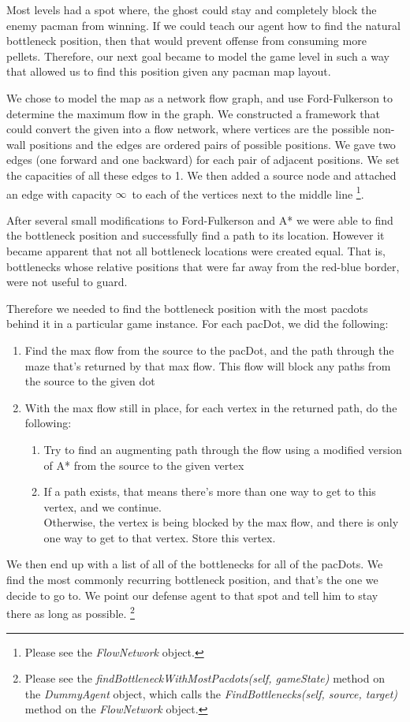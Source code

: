 \documentclass[11pt]{article}
\begin{document}
Most levels had a spot where, the ghost
could stay and completely block the enemy pacman from winning.
If we could teach our agent how to find the natural bottleneck position, then that would
prevent offense from consuming more pellets.
Therefore, our next goal became to model the game level in such a way that
allowed us to find this position given any pacman map layout. \

We chose to model the map as a network flow graph, and use Ford-Fulkerson
to determine the maximum flow in the graph. We constructed a framework that could
convert the given into a flow network, where vertices are the possible
non-wall positions and the edges are ordered pairs of possible positions. We gave two edges
(one forward and one backward) for each pair of adjacent positions. We set the capacities of
all these edges to 1. We then added a source node and attached an edge with capacity
$\infty$\ to each of the vertices next to the middle line \footnote{Please see the \textit{FlowNetwork} object.}.\



After several small modifications to
Ford-Fulkerson and A* we were able
to find the bottleneck position and successfully find a path to its location.
However it became apparent that not all bottleneck locations were created equal.
That is, bottlenecks whose relative positions that were far away from the red-blue
border, were not useful to guard.\

Therefore we needed to find the bottleneck position with the most pacdots behind it in a particular game instance.
For each pacDot, we did the following:
\begin{enumerate}
	\item Find the max flow from the source to the pacDot, and the path through the maze that's returned by that max flow.
	      This flow will block any paths from the source to the given dot
	\item With the max flow still in place, for each vertex in the returned path, do the following:
	\begin{enumerate}
		\item Try to find an augmenting path through the flow using a modified version of A* from the source to the given vertex
		\item If a path exists, that means there's more than one way to get to this vertex, and we continue.\\
		      Otherwise, the vertex is being blocked by the max flow, and there is only one way to get to that vertex. Store this vertex.
	\end{enumerate}
\end{enumerate}
We then end up with a list of all of the bottlenecks for all of the pacDots.
We find the most commonly recurring bottleneck position, and that's the one we decide to go to.
We point our defense agent to that spot and tell him to stay there as long as possible.
\footnote{Please see the \textit{findBottleneckWithMostPacdots(self, gameState)} method on the \textit{DummyAgent} object, which calls
the \textit{FindBottlenecks(self, source, target)} method on the \textit{FlowNetwork} object.}
\end{document}

